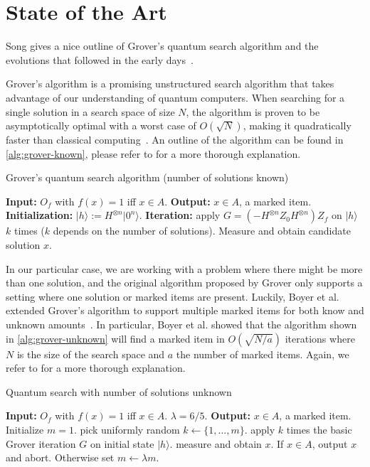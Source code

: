 \section{State of the Art}\label{sec:state-of-the-art}

Song gives a nice outline of Grover's quantum search algorithm and the evolutions that followed in the early days~\cite{song2017early}.

Grover's algorithm is a promising unstructured search algorithm that takes advantage of our understanding of quantum computers.
When searching for a single solution in a search space of size $N$, the algorithm is proven to be asymptotically optimal with a worst case of $O\left(\sqrt{N}\right)$, making it quadratically faster than classical computing~\cite{grover1996fast}.
An outline of the algorithm can be found in \autoref{alg:grover-known}, please refer to \cite{song2017early} for a more thorough explanation.

\begin{algorithm}
\caption{Grover's quantum search algorithm (number of solutions known)~\cite{song2017early}}
\begin{algorithmic}[1]
\State \textbf{Input:} $O_f$ with $f(x) = 1$ iff $x \in A$.
\State \textbf{Output:} $x \in A$, a marked item.
\State \textbf{Initialization:} $\lvert h \rangle := H^{\otimes n} \lvert 0^n \rangle$.
\State \textbf{Iteration:} apply $G = (-H^{\otimes n} Z_0 H^{\otimes n}) Z_f$ on $\lvert h \rangle$ $k$ times ($k$ depends on the number of solutions).
\State Measure and obtain candidate solution $x$.
\end{algorithmic}
\end{algorithm}\label{alg:grover-known}

In our particular case, we are working with a problem where there might be more than one solution, and the original algorithm proposed by Grover only supports a setting where one solution or marked items are present.
Luckily, Boyer et al. extended Grover's algorithm to support multiple marked items for both know and unknown amounts~\cite{boyer1998tight}.
In particular, Boyer et al. showed that the algorithm shown in \ref{alg:grover-unknown} will find a marked item in $O(\sqrt{N/a})$ iterations where $N$ is the size of the search space and $a$ the number of marked items.
Again, we refer to \cite{song2017early} for a more thorough explanation.

\begin{algorithm}
\caption{Quantum search with number of solutions unknown~\cite{song2017early}}
\begin{algorithmic}[1]
\State \textbf{Input:} $O_f$ with $f(x) = 1$ iff $x \in A$. $\lambda = 6/5$.
\State \textbf{Output:} $x \in A$, a marked item.
\State Initialize $m = 1$.
    \State pick uniformly random $k \leftarrow \{1, \ldots, m\}$.
    \State apply $k$ times the basic Grover iteration $G$ on initial state $\lvert h \rangle$.
    \State measure and obtain $x$. If $x \in A$, output $x$ and abort. Otherwise set $m \leftarrow \lambda m$.
\EndWhile
\end{algorithmic}
\end{algorithm}\label{alg:grover-unknown}
